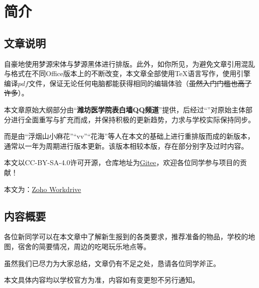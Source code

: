 \chapter[简介]{简介}
\section[文章说明]{文章说明}

自豪地使用梦源宋体与梦源黑体进行排版。此外，如你所见，为避免文章引用混乱与格式在不同Office版本上的不断改变，本文章全部使用\TeX 语言写作，使用\XeLaTeX 引擎编译$pdf$文件，保证无论任何电脑都能获得相同的编辑体验（\sout{虽然入门门槛也高了许多}）。

本文章原始大纲部分由“\textbf{潍坊医学院表白墙QQ频道}”提供，后经过“\textbf{}”对原始主体部分进行全面重写与扩充而成，并保持积极的更新趋势，力求与学校实际保持同步。

而\textbf{}是由“浮烟山小麻花”“vv”“花海”等人在本文的基础上进行重排版而成的新版本，通常以一年为周期进行版本更新。该版本相较本版，存在部分别字及过时内容。

\bigbreak
\textbf{}

本文以CC-BY-SA-4.0许可开源，仓库地址为\uline{\href{https://gitee.com/mikazo/guide_for_freshman}{Gitee}}，欢迎各位同学参与项目的贡献！

本文\textbf{}为：\uline{\href{https://workdrive.zohoexternal.com/folder/sx5ijbbd2ad4d669c4c358d59fe314410aaf4}{Zoho Workdrive}}

\section[内容概要]{内容概要}

各位新同学可以在本文章中了解新生报到的各类要求，推荐准备的物品，学校的地图，宿舍的简要情况，周边的吃喝玩乐地点等。

虽然我们已尽力为大家总结，文章仍有不足之处，恳请各位同学斧正。

本文具体内容均以学校官方为准，内容如有变更恕不另行通知。